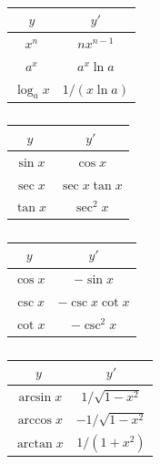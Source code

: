 \noindent\begin{minipage}{0.33\textwidth}
    \begin{table}[H]
        \centering
        \begin{tabular}{|c|c|}
        \hline
        $y$ & $y'$ \\ \hline\hline
        $x^n$ & $n x^{n-1}$ \\ \hline
        $a^x$ & $a^x \ln a$ \\ \hline
        $\log_a x$ & $1/(x\ln a)$ \\ \hline
        \end{tabular}
        \caption{}
    \end{table}
\end{minipage}
\begin{minipage}{0.33\textwidth}
    \begin{table}[H]
        \centering
        \begin{tabular}{|c|c|}
        \hline
        $y$ & $y'$ \\ \hline\hline
        $\sin x$ & $\cos x$ \\ \hline
        $\sec x$ & $\sec x \tan x$ \\ \hline
        $\tan x$ & $\sec^2 x$ \\ \hline
        \end{tabular}
        \caption{}
    \end{table}
\end{minipage}
\begin{minipage}{0.33\textwidth}
    \begin{table}[H]
        \centering
        \begin{tabular}{|c|c|}
        \hline
        $y$ & $y'$ \\ \hline\hline
        $\cos x$ & $-\sin x$ \\ \hline
        $\csc x$ & $-\csc x \cot x$ \\ \hline
        $\cot x$ & $-\csc^2 x$ \\ \hline
        \end{tabular}
        \caption{}
    \end{table}
\end{minipage}

{\renewcommand{\arraystretch}{1.2}
\begin{table}[H]
    \centering
    \begin{tabular}{|c|c|}
    \hline
    $y$ & $y'$ \\ \hline\hline
    $\arcsin x$ & $1/\sqrt{1 - x^2}$ \\ \hline
    $\arccos x$ & $-1/\sqrt{1 - x^2}$ \\ \hline
    $\arctan x$ & $1/(1 + x^2)$ \\ \hline
    \end{tabular}
    \caption{}
\end{table}}

